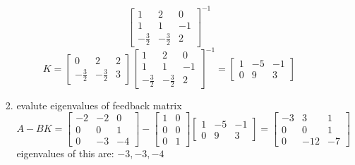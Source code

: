 \begin{enumerate}
\begin{enumerate}
\begin{enumerate}
\begin{equation}
\begin{bmatrix}
            1 & 2 & 0 \\
            1 & 1 & -1 \\
            -\frac 3 2 & -\frac 3 2 & 2
          \end{bmatrix}^{-1}
        \end{equation}
        \begin{equation}
          K =
          \begin{bmatrix}
            0 & 2 & 2 \\
            -\frac 3 2 & -\frac 3 2 & 3
          \end{bmatrix}
          \begin{bmatrix}
            1 & 2 & 0 \\
            1 & 1 & -1 \\
            -\frac 3 2 & -\frac 3 2 & 2
          \end{bmatrix}^{-1}=
          \begin{bmatrix}
            1 & -5 & -1 \\
            0 & 9 & 3
          \end{bmatrix}
        \end{equation}
      \item evalute eigenvalues of feedback matrix
        \begin{equation}
          A - BK =
          \begin{bmatrix}
            -2 & -2 & 0 \\
            0 & 0 & 1 \\
            0 & -3 & -4 
          \end{bmatrix} -
          \begin{bmatrix}
            1 & 0 \\
            0 & 0 \\
            0 & 1
          \end{bmatrix}
          \begin{bmatrix}
            1 & -5 & -1 \\
            0 & 9 & 3
          \end{bmatrix} =
          \begin{bmatrix}
            -3 & 3 & 1 \\
            0 & 0 & 1 \\
            0 & -12 & -7
          \end{bmatrix}
        \end{equation}
        eigenvalues of this are: $-3, -3, -4$
      \end{enumerate}

\end{enumerate}
\end{enumerate}
